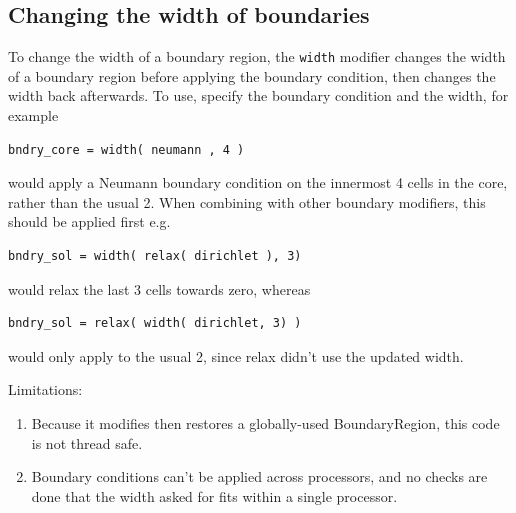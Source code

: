 \documentclass[12pt]{article}
\newcommand{\code}[1]{\texttt{#1}}
\begin{document}
\subsection{Changing the width of boundaries}
%
To change the width of a boundary region, the \code{width} modifier changes the
width of a boundary region before applying the boundary condition, then changes
the width back afterwards. To use, specify the boundary condition and the
width, for example
%
\begin{lstlisting}[numbers=none]
bndry_core = width( neumann , 4 )
\end{lstlisting}
%
would apply a Neumann boundary condition on the innermost 4 cells in the core,
rather than the usual 2.  When combining with other boundary modifiers, this
should be applied first e.g.
%
\begin{lstlisting}[numbers=none]
bndry_sol = width( relax( dirichlet ), 3)
\end{lstlisting}
%
would relax the last 3 cells towards zero, whereas
%
\begin{lstlisting}[numbers=none]
bndry_sol = relax( width( dirichlet, 3) )
\end{lstlisting}
%
would only apply to the usual 2, since relax didn't use the updated width.

Limitations:
%
\begin{enumerate}
  \item Because it modifies then restores a globally-used BoundaryRegion, this
      code is not thread safe.

  \item Boundary conditions can't be applied across processors, and no checks
      are done that the width asked for fits within a single processor.
\end{enumerate}
%
\end{document}
